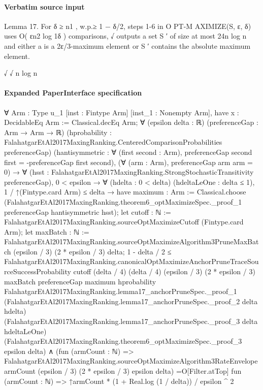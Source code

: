 \documentclass[10pt]{article}
\begin{document}
\paragraph{Verbatim source input}
\begin{ReviewVerbatim}
Lemma 17. For δ ≥ n1 , w.p.≥ 1 − δ/2, steps 1-6 in O PT-M AXIMIZE(S, ε, δ) uses O( εn2 log 1δ ) comparisons,
                                 √
outputs a set S ′ of size at most 24n log n and either a is a 2ε/3-maximum element or S ′ contains the absolute
maximum element.

                                                           √                         √
                                                                                       n log n
\end{ReviewVerbatim}



\paragraph{Expanded PaperInterface specification}
\begin{ReviewVerbatim}
∀ {Arm : Type u_1} [inst : Fintype Arm] [inst_1 : Nonempty Arm],
  have x : DecidableEq Arm := Classical.decEq Arm;
  ∀ (epsilon delta : ℝ) (preferenceGap : Arm → Arm → ℝ)
    (hprobability : FalahatgarEtAl2017MaxingRanking.CenteredComparisonProbabilities preferenceGap)
    (hantisymmetric : ∀ (first second : Arm), preferenceGap second first = -preferenceGap first second),
    (∀ (arm : Arm), preferenceGap arm arm = 0) →
      ∀ (hsst : FalahatgarEtAl2017MaxingRanking.StrongStochasticTransitivity preferenceGap),
        0 < epsilon →
          ∀ (hdelta : 0 < delta) (hdeltaLeOne : delta ≤ 1),
            1 / ↑(Fintype.card Arm) ≤ delta →
              have maximum : Arm :=
                Classical.choose
                  (FalahatgarEtAl2017MaxingRanking.theorem6_optMaximizeSpec._proof_1 preferenceGap hantisymmetric hsst);
              let cutoff : ℕ := FalahatgarEtAl2017MaxingRanking.sourceOptMaximizeCutoff (Fintype.card Arm);
              let maxBatch : ℕ :=
                FalahatgarEtAl2017MaxingRanking.sourceOptMaximizeAlgorithm3PruneMaxBatch (epsilon / 3) (2 * epsilon / 3)
                  delta;
              1 - delta / 2 ≤
                  FalahatgarEtAl2017MaxingRanking.canonicalOptMaximizeAnchorPruneTraceSourceSuccessProbability cutoff
                    (delta / 4) (delta / 4) (epsilon / 3) (2 * epsilon / 3) maxBatch preferenceGap maximum hprobability
                    FalahatgarEtAl2017MaxingRanking.lemma17_anchorPruneSpec._proof_1
                    (FalahatgarEtAl2017MaxingRanking.lemma17_anchorPruneSpec._proof_2 delta hdelta)
                    (FalahatgarEtAl2017MaxingRanking.lemma17_anchorPruneSpec._proof_3 delta hdeltaLeOne)
                    (FalahatgarEtAl2017MaxingRanking.theorem6_optMaximizeSpec._proof_3 epsilon delta) ∧
                (fun (armCount : ℕ) =>
                    FalahatgarEtAl2017MaxingRanking.sourceOptMaximizeAlgorithm3RateEnvelope armCount (epsilon / 3)
                      (2 * epsilon / 3) epsilon delta) =O[Filter.atTop]
                  fun (armCount : ℕ) => ↑armCount * (1 + Real.log (1 / delta)) / epsilon ^ 2
\end{ReviewVerbatim}
\end{document}
